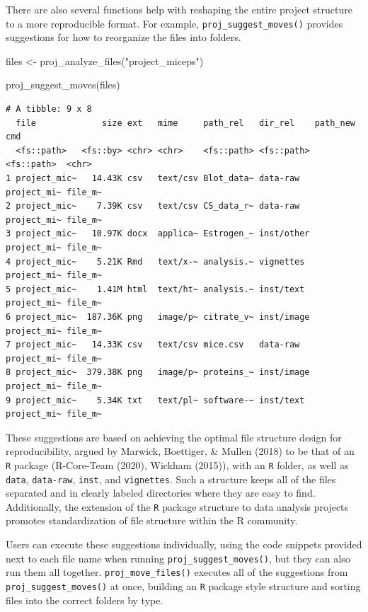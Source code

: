 \documentclass[12pt,twoside]{reedthesis}
\newenvironment{Shaded}{\begin{snugshade}}{\end{snugshade}}
\newcommand{\FunctionTok}[1]{\textcolor[rgb]{0.00,0.00,0.00}{#1}}
\newcommand{\NormalTok}[1]{#1}
\newcommand{\OtherTok}[1]{\textcolor[rgb]{0.56,0.35,0.01}{#1}}
\newcommand{\StringTok}[1]{\textcolor[rgb]{0.31,0.60,0.02}{#1}}
\begin{document}
There are also several functions help with reshaping the entire project structure to a more reproducible format. For example, \texttt{proj\_suggest\_moves()} provides suggestions for how to reorganize the files into folders.
\begin{Shaded}
\begin{Highlighting}[]
\NormalTok{files }\OtherTok{\textless{}{-}} \FunctionTok{proj\_analyze\_files}\NormalTok{(}\StringTok{"project\_miceps"}\NormalTok{)}

\FunctionTok{proj\_suggest\_moves}\NormalTok{(files)}
\end{Highlighting}
\end{Shaded}
\footnotesize
\begin{verbatim}
# A tibble: 9 x 8
  file             size ext   mime     path_rel   dir_rel    path_new    cmd    
  <fs::path>   <fs::by> <chr> <chr>    <fs::path> <fs::path> <fs::path>  <chr>  
1 project_mic~   14.43K csv   text/csv Blot_data~ data-raw   project_mi~ file_m~
2 project_mic~    7.39K csv   text/csv CS_data_r~ data-raw   project_mi~ file_m~
3 project_mic~   10.97K docx  applica~ Estrogen_~ inst/other project_mi~ file_m~
4 project_mic~    5.21K Rmd   text/x-~ analysis.~ vignettes  project_mi~ file_m~
5 project_mic~    1.41M html  text/ht~ analysis.~ inst/text  project_mi~ file_m~
6 project_mic~  187.36K png   image/p~ citrate_v~ inst/image project_mi~ file_m~
7 project_mic~   14.33K csv   text/csv mice.csv   data-raw   project_mi~ file_m~
8 project_mic~  379.38K png   image/p~ proteins_~ inst/image project_mi~ file_m~
9 project_mic~    5.34K txt   text/pl~ software-~ inst/text  project_mi~ file_m~
\end{verbatim}
\normalsize

These suggestions are based on achieving the optimal file structure design for reproducibility, argued by Marwick, Boettiger, \& Mullen (2018) to be that of an \texttt{R} package (R-Core-Team (2020), Wickham (2015)), with an \texttt{R} folder, as well as \texttt{data}, \texttt{data-raw}, \texttt{inst}, and \texttt{vignettes}. Such a structure keeps all of the files separated and in clearly labeled directories where they are easy to find. Additionally, the extension of the \texttt{R} package structure to data analysis projects promotes standardization of file structure within the R community.

Users can execute these suggestions individually, using the code snippets provided next to each file name when running \texttt{proj\_suggest\_moves()}, but they can also run them all together. \texttt{proj\_move\_files()} executes all of the suggestions from \texttt{proj\_suggest\_moves()} at once, building an \texttt{R} package style structure and sorting files into the correct folders by type.
\end{document}
